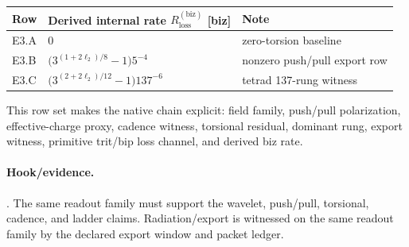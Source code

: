 {\footnotesize
\begin{center}
\begin{tabular}{@{}lll@{}}
\toprule
Row & Derived internal rate $R_{\mathrm{loss}}^{(\mathrm{biz})}$ [biz] & Note \\
\midrule
E3.A & $0$ & zero-torsion baseline \\
E3.B & $\bigl(3^{(1+2\ell_2)/8}-1\bigr)5^{-4}$ & nonzero push/pull export row \\
E3.C & $\bigl(3^{(2+2\ell_2)/12}-1\bigr)137^{-6}$ & tetrad 137-rung witness \\
\bottomrule
\end{tabular}
\end{center}}

This row set makes the native chain explicit: field family, push/pull polarization, effective-charge proxy, cadence witness, torsional residual, dominant rung, export witness, primitive trit/bip loss channel, and derived biz rate.
\paragraph{Hook/evidence.} . The same readout family must support the wavelet, push/pull, torsional, cadence, and ladder claims. Radiation/export is witnessed on the same readout family by the declared export window and packet ledger.
